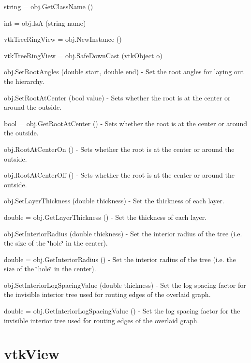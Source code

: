 \begin{DoxyItemize}
\item {\ttfamily string = obj.\-Get\-Class\-Name ()}  
\item {\ttfamily int = obj.\-Is\-A (string name)}  
\item {\ttfamily vtk\-Tree\-Ring\-View = obj.\-New\-Instance ()}  
\item {\ttfamily vtk\-Tree\-Ring\-View = obj.\-Safe\-Down\-Cast (vtk\-Object o)}  
\item {\ttfamily obj.\-Set\-Root\-Angles (double start, double end)} -\/ Set the root angles for laying out the hierarchy.  
\item {\ttfamily obj.\-Set\-Root\-At\-Center (bool value)} -\/ Sets whether the root is at the center or around the outside.  
\item {\ttfamily bool = obj.\-Get\-Root\-At\-Center ()} -\/ Sets whether the root is at the center or around the outside.  
\item {\ttfamily obj.\-Root\-At\-Center\-On ()} -\/ Sets whether the root is at the center or around the outside.  
\item {\ttfamily obj.\-Root\-At\-Center\-Off ()} -\/ Sets whether the root is at the center or around the outside.  
\item {\ttfamily obj.\-Set\-Layer\-Thickness (double thickness)} -\/ Set the thickness of each layer.  
\item {\ttfamily double = obj.\-Get\-Layer\-Thickness ()} -\/ Set the thickness of each layer.  
\item {\ttfamily obj.\-Set\-Interior\-Radius (double thickness)} -\/ Set the interior radius of the tree (i.\-e. the size of the \char`\"{}hole\char`\"{} in the center).  
\item {\ttfamily double = obj.\-Get\-Interior\-Radius ()} -\/ Set the interior radius of the tree (i.\-e. the size of the \char`\"{}hole\char`\"{} in the center).  
\item {\ttfamily obj.\-Set\-Interior\-Log\-Spacing\-Value (double thickness)} -\/ Set the log spacing factor for the invisible interior tree used for routing edges of the overlaid graph.  
\item {\ttfamily double = obj.\-Get\-Interior\-Log\-Spacing\-Value ()} -\/ Set the log spacing factor for the invisible interior tree used for routing edges of the overlaid graph.  
\end{DoxyItemize}\hypertarget{vtkviews_vtkview}{}\section{vtk\-View}\label{vtkviews_vtkview}
